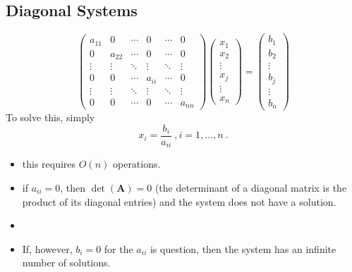 \documentclass[12pt]{exam}
\newcommand{\ve}[1]{\ensuremath{\mathbf{#1}}}
\begin{document}
\subsection*{Diagonal Systems}
\begin{equation}
   \begin{pmatrix}
      a_{11} & 0      & \cdots & 0      & \cdots & 0 \\
      0      & a_{22} & \cdots & 0      & \cdots & 0 \\
      \vdots & \vdots & \ddots & \vdots & \ddots & \vdots \\     
      0      & 0      & \cdots & a_{ii} & \cdots & 0 \\
      \vdots & \vdots & \ddots & \vdots & \ddots & \vdots \\
      0      & 0      & \cdots & 0      & \cdots & a_{nn} 
    \end{pmatrix} 
    \begin{pmatrix} x_1 \\ x_2 \\ \vdots \\ x_j \\ \vdots \\ x_n \end{pmatrix} =
    \begin{pmatrix} b_1 \\ b_2 \\ \vdots \\ b_j \\ \vdots \\ b_n \end{pmatrix}
    \nonumber   
\end{equation} 
%
To solve this, simply
%
\[x_i = \frac{b_i}{a_{ii}} \:, i=1,\dots,n\:.\]
%
\begin{itemize}
\item this requires $O(n)$ operations.
\ifprintanswers
\item if $a_{ii}=0$, then $\det(\ve{A})=0$ (the determinant of a diagonal matrix is the product of its diagonal entries) and the system does not have a solution.
  \else
  \item
  \fi
\item If, however, $b_i = 0$ for the $a_{ii}$ is question, then the system has an infinite number of solutions.
\end{itemize}

\end{document}
